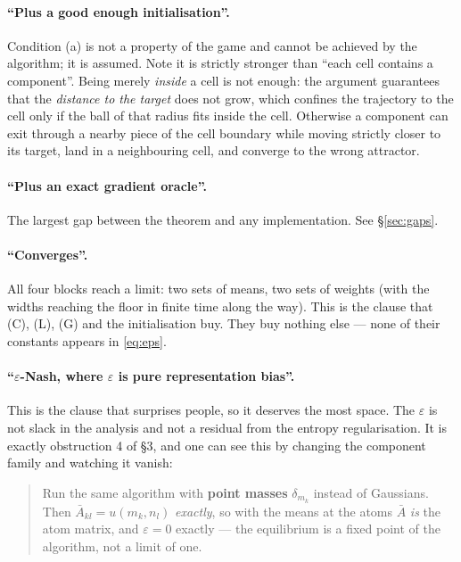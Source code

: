 \documentclass[11pt]{article}
\theoremstyle{definition}
\begin{document}
\paragraph{``Plus a good enough initialisation''.}
Condition (a) is not a property of the game and cannot be achieved by the
algorithm; it is assumed. Note it is strictly stronger than ``each cell contains
a component''. Being merely \emph{inside} a cell is not enough: the argument
guarantees that the \emph{distance to the target} does not grow, which confines
the trajectory to the cell only if the ball of that radius fits inside the cell.
Otherwise a component can exit through a nearby piece of the cell boundary while
moving strictly closer to its target, land in a neighbouring cell, and converge to
the wrong attractor.

\paragraph{``Plus an exact gradient oracle''.}
The largest gap between the theorem and any implementation. See \S\ref{sec:gaps}.

\paragraph{``Converges''.}
All four blocks reach a limit: two sets of means, two sets of weights (with the
widths reaching the floor in finite time along the way). This is the clause that
(C), (L), (G) and the initialisation buy. They buy nothing else --- none of their
constants appears in \eqref{eq:eps}.

\paragraph{``$\varepsilon$-Nash, where $\varepsilon$ is pure representation bias''.}
This is the clause that surprises people, so it deserves the most space. The
$\varepsilon$ is not slack in the analysis and not a residual from the entropy
regularisation. It is exactly obstruction 4 of \S3, and one can see this by
changing the component family and watching it vanish:

\begin{quote}
Run the same algorithm with \textbf{point masses} $\delta_{m_k}$ instead of
Gaussians. Then $\bar A_{kl} = u(m_k, n_l)$ \emph{exactly}, so with the means at
the atoms $\bar A$ \emph{is} the atom matrix, and $\varepsilon = 0$ exactly ---
the equilibrium is a fixed point of the algorithm, not a limit of one.
\end{quote}
\end{document}
